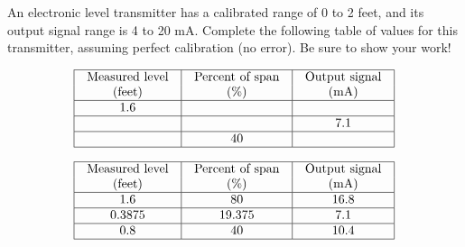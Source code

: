 

An electronic level transmitter has a calibrated range of 0 to 2 feet, and its output signal range is 4 to 20 mA.  Complete the following table of values for this transmitter, assuming perfect calibration (no error).  Be sure to show your work!


$$\vbox{\offinterlineskip
\halign{\strut
\vrule \quad\hfil # \ \hfil & 
\vrule \quad\hfil # \ \hfil & 
\vrule \quad\hfil # \ \hfil \vrule \cr
\noalign{\hrule}
%
Measured level & Percent of span & Output signal \cr
%
(feet) & (\%) & (mA) \cr
%
\noalign{\hrule}
%
1.6 &  &  \cr
%
\noalign{\hrule}
%
 &  & 7.1 \cr
%
\noalign{\hrule}
%
 & 40 &  \cr
%
\noalign{\hrule}
} %
}$$ %








$$\vbox{\offinterlineskip
\halign{\strut
\vrule \quad\hfil # \ \hfil & 
\vrule \quad\hfil # \ \hfil & 
\vrule \quad\hfil # \ \hfil \vrule \cr
\noalign{\hrule}
%
Measured level & Percent of span & Output signal \cr
%
(feet) & (\%) & (mA) \cr
%
\noalign{\hrule}
%
1.6 & 80 & 16.8 \cr
%
\noalign{\hrule}
%
0.3875 & 19.375 & 7.1 \cr
%
\noalign{\hrule}
%
0.8 & 40 & 10.4 \cr
%
\noalign{\hrule}
} %
}$$ %












